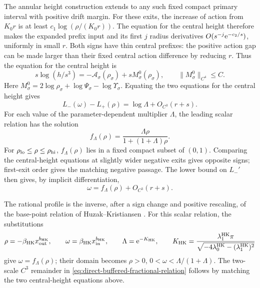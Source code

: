 The annular height construction extends to any such fixed
compact primary interval with positive drift margin.
For these exits, the increase of action from \(K_0r\)
is at least \(c_1\log(\rho/(K_0r))\).
The equation for the central height therefore makes the expanded
prefix input and its first \(j\) radius derivatives
\(O(s^{-j}\mathrm e^{-c_2/s})\), uniformly in small \(r\).
Both signs have thin central prefixes: the positive action
gap can be made larger than their fixed central action
difference by reducing \(r\).
Thus the equation for the central height is
\begin{equation}
\label{eq:direct-buffered-primary-source}
 s\log(h/s^3)=-\mathcal A_\sigma(\rho_\sigma)
                 +sM_\sigma^0(\rho_\sigma),\qquad
 \|M_\sigma^0\|_{C^4}\le C .
\end{equation}
Here \(M_\sigma^0=2\log\rho_\sigma+\log\Psi_\sigma-\log\Upsilon_\sigma\).
Equating the two equations for the central height gives
\[
 L_-(\omega)-L_+(\rho)=\log\Lambda+O_{C^3}(r+s).
\]
For each value of the parameter-dependent multiplier \(\Lambda\),
the leading scalar relation has the solution
\[
 f_\Lambda(\rho)=\frac{\Lambda\rho}{1+(1+\Lambda)\rho}.
\]
For \(\rho_{\rm lo}\le\rho\le\rho_{\rm hi}\), \(f_\Lambda(\rho)\) lies
in a fixed compact subset of \((0,1)\). Comparing the central-height
equations at slightly wider negative exits gives opposite signs;
first-exit order gives the matching negative passage.
The lower bound on \(L_-'\) then gives, by implicit differentiation,
\begin{equation}
\label{eq:direct-buffered-fractional-relation}
 \omega=f_\Lambda(\rho)+O_{C^3}(r+s).
\end{equation}

The rational profile is the inverse, after a sign change and positive
rescaling, of the base-point relation of Huzak--Kristiansen
\cite[(2.13) and (6.8)]{HK2026}.
For this scalar relation, the substitutions
\[
 \rho=-\beta_{\rm HK}x_{\rm out}^{b_{\rm HK}},\qquad
 \omega=\beta_{\rm HK}x_{\rm in}^{b_{\rm HK}},\qquad
 \Lambda=\mathrm e^{-K_{\rm HK}},\qquad
 K_{\rm HK}=\frac{\lambda_1^{\rm HK}\pi}
            {\sqrt{-4\lambda_0^{\rm HK}-(\lambda_1^{\rm HK})^2}}
\]
give \(\omega=f_\Lambda(\rho)\); their domain becomes
\(\rho>0\), \(0<\omega<\Lambda/(1+\Lambda)\).
The two-scale \(C^3\) remainder in
\eqref{eq:direct-buffered-fractional-relation} follows by matching the
two central-height equations above.

